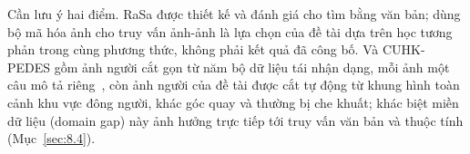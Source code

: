 Cần lưu ý hai điểm. RaSa được thiết kế và đánh giá cho tìm bằng văn bản; dùng bộ mã hóa ảnh cho truy vấn ảnh-ảnh là lựa chọn của đề tài dựa trên học tương phản trong cùng phương thức, không phải kết quả đã công bố. Và CUHK-PEDES gồm ảnh người cắt gọn từ năm bộ dữ liệu tái nhận dạng, mỗi ảnh một câu mô tả riêng~\cite{li2017cuhkpedes}, còn ảnh người của đề tài được cắt tự động từ khung hình toàn cảnh khu vực đông người, khác góc quay và thường bị che khuất; khác biệt miền dữ liệu (domain gap) này ảnh hưởng trực tiếp tới truy vấn văn bản và thuộc tính (Mục~\ref{sec:8.4}).
